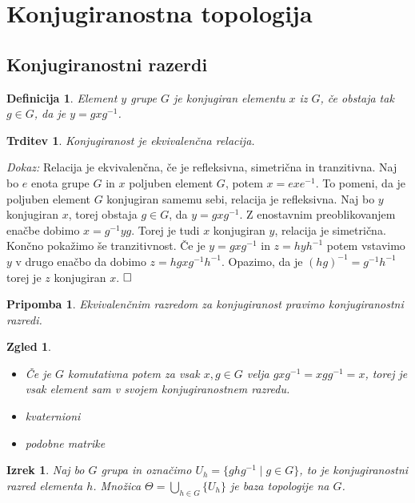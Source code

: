 \documentclass[a4paper,12pt]{article}
\def\qed{$\hfill\Box$}   %
\newtheorem{izrek}{Izrek}
\newtheorem{trditev}{Trditev}
\newtheorem{pripomba}{Pripomba}
\newtheorem{definicija}{Definicija}
\newtheorem{zgled}{Zgled}
\begin{document}
\section{Konjugiranostna topologija}



\subsection{Konjugiranostni razerdi}

\begin{definicija}
    Element $y$ grupe $G$ je \emph{konjugiran} elementu $x$ iz $G$, če obstaja tak $g \in G$, da je $y = gxg^{-1}$.
\end{definicija}

\begin{trditev}
    Konjugiranost je ekvivalenčna relacija.
\end{trditev}

\noindent
{\em Dokaz:\/}
    Relacija je ekvivalenčna, če je refleksivna, simetrična in tranzitivna. Naj bo $e$ enota grupe $G$ in $x$ poljuben element $G$, potem $x = exe^{-1}$.
    To pomeni, da je poljuben element $G$ konjugiran samemu sebi, relacija je refleksivna.
    Naj bo $y$ konjugiran $x$, torej obstaja $g \in G$, da $y = gxg^{-1}$. Z enostavnim preoblikovanjem enačbe dobimo $x = g^{-1}yg$.
    Torej je tudi $x$ konjugiran $y$, relacija je simetrična.
    Končno pokažimo še tranzitivnost. Če je $y = gxg^{-1}$ in $z = hyh^{-1}$ potem vstavimo $y$ v drugo enačbo da dobimo $z = hgxg^{-1}h^{-1}$.
    Opazimo, da je $(hg)^{-1} = g^{-1}h^{-1}$ torej je $z$ konjugiran $x$.
\qed

\begin{pripomba}
    Ekvivalenčnim razredom za konjugiranost pravimo \emph{konjugiranostni razredi}.
\end{pripomba}

\begin{zgled}
    \begin{itemize}
        \item Če je $G$ komutativna potem za vsak $x,g \in G$ velja $gxg^{-1} = xgg^{-1} = x$, torej je vsak element sam v svojem konjugiranostnem razredu.
        \item kvaternioni
        \item podobne matrike
    \end{itemize}
\end{zgled}


\begin{izrek}
    Naj bo $G$ grupa in označimo $U_h = \{ghg^{-1} \mid g \in G \}$, to je konjugiranostni razred elementa $h$.
    Množica $\Theta = \bigcup_{h \in G}\{U_h\}$ je baza topologije na $G$.
\end{izrek}
\end{document}
